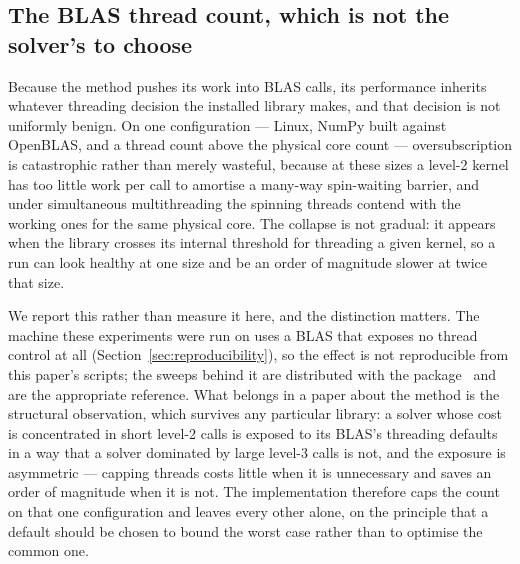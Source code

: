 \subsection{The BLAS thread count, which is not the solver's to choose}
\label{ssec:threads}

Because the method pushes its work into BLAS calls, its performance inherits
whatever threading decision the installed library makes, and that decision is not
uniformly benign. On one configuration --- Linux, NumPy built against OpenBLAS,
and a thread count above the physical core count --- oversubscription is
catastrophic rather than merely wasteful, because at these sizes a level-2 kernel
has too little work per call to amortise a many-way spin-waiting barrier, and
under simultaneous multithreading the spinning threads contend with the working
ones for the same physical core. The collapse is not gradual: it appears when the
library crosses its internal threshold for threading a given kernel, so a run can
look healthy at one size and be an order of magnitude slower at twice that size.

We report this rather than measure it here, and the distinction matters. The
machine these experiments were run on uses a BLAS that exposes no thread control
at all (Section~\ref{sec:reproducibility}), so the effect is not reproducible from
this paper's scripts; the sweeps behind it are distributed with the
package~\cite{cvxquadprog} and are the appropriate reference. What belongs in a
paper about the method is the structural observation, which survives any
particular library: a solver whose cost is concentrated in short level-2 calls is
exposed to its BLAS's threading defaults in a way that a solver dominated by large
level-3 calls is not, and the exposure is asymmetric --- capping threads costs
little when it is unnecessary and saves an order of magnitude when it is not.
The implementation therefore caps the count on that one configuration and leaves
every other alone, on the principle that a default should be chosen to bound the
worst case rather than to optimise the common one.
